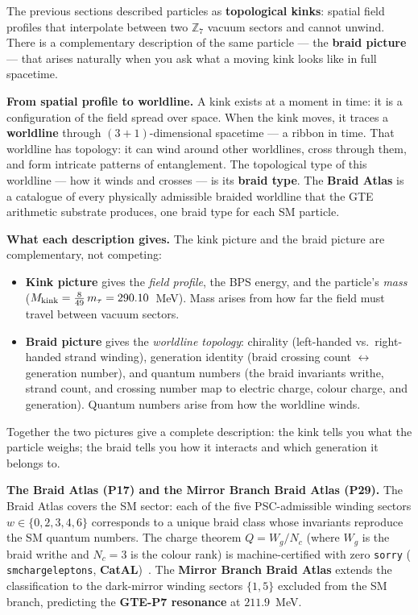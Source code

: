\documentclass[11pt,a4paper]{article}
\newcommand{\term}[1]{\textbf{#1}}
\newcommand{\lean}[1]{%
  \penalty-100
  \begingroup\def\_{\textunderscore\allowbreak}\texttt{#1}\endgroup}
\newcommand{\CatAL}{\textbf{CatAL}}
\newcommand{\Mkink}{M_{\rm kink}}
\begin{document}
The previous sections described particles as \term{topological kinks}: spatial field
profiles that interpolate between two $\mathbb{Z}_7$ vacuum sectors and cannot unwind.
There is a complementary description of the same particle --- the \term{braid picture}
--- that arises naturally when you ask what a moving kink looks like in full spacetime.

\textbf{From spatial profile to worldline.}
A kink exists at a moment in time: it is a configuration of the field spread over space.
When the kink moves, it traces a \term{worldline} through $(3{+}1)$-dimensional
spacetime --- a ribbon in time.  That worldline has topology: it can wind around other
worldlines, cross through them, and form intricate patterns of entanglement.
The topological type of this worldline --- how it winds and crosses --- is its
\term{braid type}.  The \term{Braid Atlas} \cite{SpivackBraidAtlas} is a
catalogue of every physically admissible braided worldline that the GTE arithmetic
substrate produces, one braid type for each SM particle.

\textbf{What each description gives.}
The kink picture and the braid picture are complementary, not competing:

\begin{itemize}[itemsep=4pt]
  \item \textbf{Kink picture} gives the \emph{field profile}, the BPS energy, and the
    particle's \emph{mass} ($\Mkink = \tfrac{8}{49}\,m_\tau = 290.10$~MeV).
    Mass arises from how far the field must travel between vacuum sectors.

  \item \textbf{Braid picture} gives the \emph{worldline topology}: chirality
    (left-handed vs.\ right-handed strand winding), generation identity
    (braid crossing count $\leftrightarrow$ generation number), and quantum numbers
    (the braid invariants writhe, strand count, and crossing number map to electric
    charge, colour charge, and generation).
    Quantum numbers arise from how the worldline winds.
\end{itemize}

Together the two pictures give a complete description: the kink tells you what the
particle weighs; the braid tells you how it interacts and which generation it belongs to.

\textbf{The Braid Atlas (P17) and the Mirror Branch Braid Atlas (P29).}
The Braid Atlas \cite{SpivackBraidAtlas} covers the SM sector: each of the five
PSC-admissible winding sectors $w \in \{0,2,3,4,6\}$ corresponds to a unique braid
class whose invariants reproduce the SM quantum numbers.  The charge theorem
$Q = W_g/N_c$ (where $W_g$ is the braid writhe and $N_c = 3$ is the colour rank)
is machine-certified with zero \texttt{sorry}
(\lean{sm\_charge\_leptons}, \CatAL)~\cite{SpivackGTECompleteFramework}.
The \term{Mirror Branch Braid Atlas} \cite{SpivackMirrorBraidAtlas} extends the
classification to the dark-mirror winding sectors $\{1,5\}$ excluded from the SM
branch, predicting the \term{GTE-P7 resonance} at $211.9$~MeV.
\end{document}
